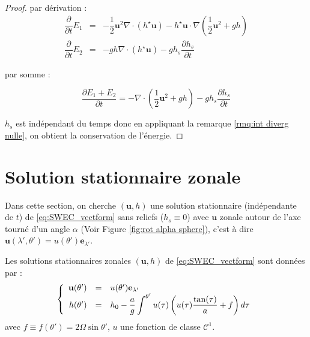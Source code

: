\begin{proof}
par dérivation :
\begin{equation}
\begin{array}{rcl}
\dfrac{\partial}{\partial t} E_1 & = & -\dfrac{1}{2} \mathbf{u}^2 \nabla \cdot \left( h^{\star} \mathbf{u} \right) - h^{\star} \mathbf{u} \cdot \nabla \left( \dfrac{1}{2} \mathbf{u}^2 + gh \right) \\
\dfrac{\partial}{\partial t} E_2 & = & - gh \nabla \cdot \left( h^{\star} \mathbf{u} \right) - g h_s \dfrac{\partial h_s}{\partial t} 
\end{array}
\end{equation}

par somme :

$$
\dfrac{\partial E_1 + E_2}{\partial t} = - \nabla \cdot \left( \dfrac{1}{2} \mathbf{u}^2 + gh \right) - g h_s \dfrac{\partial h_s}{\partial t} 
$$

$h_s$ est indépendant du temps donc en appliquant la remarque \ref{rmq:int diverg nulle}, on obtient la conservation de l'énergie.
\end{proof}















\section{Solution stationnaire zonale}

Dans cette section, on cherche $(\mathbf{u},h)$ une solution stationnaire (indépendante de $t$) de \eqref{eq:SWEC_vectform} sans reliefs ($h_s \equiv 0$) avec $\mathbf{u}$ zonale autour de l'axe tourné d'un angle $\alpha$ (Voir Figure \ref{fig:rot alpha sphere}), c'est à dire $\mathbf{u}(\lambda', \theta') = u(\theta') \mathbf{e}_{\lambda'}$.

\begin{proposition}
Les solutions stationnaires zonales $(\mathbf{u},h)$ de \eqref{eq:SWEC_vectform} sont données par :
\begin{equation}
\left\lbrace
\begin{array}{rcl}
\mathbf{u}(\theta') & = & u(\theta') \mathbf{e}_{\lambda'}\\
h(\theta') & = & h_0 - \dfrac{a}{g} \displaystyle\int^{\theta'} u(\tau) \left( u(\tau) \dfrac{\tan (\tau)}{a} + f \right) d\tau\\
\end{array}
\right.
\label{eq:sol. stationaire zonale de swe}
\end{equation}
avec $f \equiv f(\theta') = 2 \Omega \sin \theta'$, $u$ une fonction de classe $\mathcal{C}^1$.
\end{proposition}

